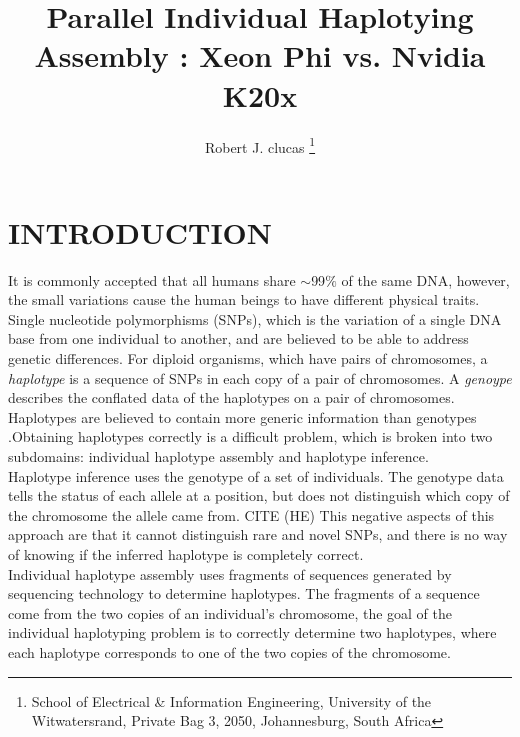 \documentclass[10pt,twocolumn]{witseiepaper}
\begin{document}
\title{Parallel Individual Haplotying Assembly : Xeon Phi vs. Nvidia K20x}

\author{Robert J. clucas
\thanks{School of Electrical \& Information Engineering, University of the
Witwatersrand, Private Bag 3, 2050, Johannesburg, South Africa}
}


\abstract{}


\maketitle
\thispagestyle{empty}\pagestyle{empty}



\section{INTRODUCTION}

It is commonly accepted that all humans share $\mathtt{\sim}$99$\%$ of the same DNA, however, the small variations 
cause the human beings to have different physical traits. Single nucleotide polymorphisms (SNPs), which is
the variation of a single DNA base from one individual to another, and are believed to be able to address
genetic differences. For diploid organisms, which have pairs of chromosomes, a \textit{haplotype} is a 
sequence of SNPs in each copy of a pair of chromosomes. A \textit{genoype} describes the conflated data of the
haplotypes on a pair of chromosomes. Haplotypes are believed to contain more generic information than
genotypes \cite{stephens:2001}.Obtaining haplotypes correctly is a difficult problem, which is broken into 
two subdomains: individual haplotype assembly and haplotype inference. \\
Haplotype inference uses the genotype of a set of individuals. The genotype data tells the status of each
allele at a position, but does not distinguish which copy of the chromosome the allele came from. CITE (HE)
This negative aspects of this approach are that it cannot distinguish rare and novel SNPs, and there is no way
of knowing if the inferred haplotype is completely correct. \\
Individual haplotype assembly uses fragments of sequences generated by sequencing technology to determine
haplotypes. The fragments of a sequence come from the two copies of an individual's chromosome, the goal of the
individual haplotyping problem is to correctly determine two haplotypes, where each haplotype corresponds to
one of the two copies of the chromosome.
\end{document}
